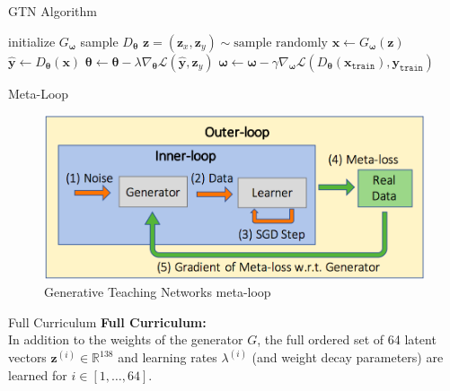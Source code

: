 \documentclass[10pt,usenames,dvipsnames]{beamer}
\renewcommand\vec[1]{\boldsymbol{\mathbf {#1}}}
\newcommand\R{\mathbb {R}}
\begin{document}
\begin{frame}{GTN Algorithm}
    \begin{algorithm}[H]
    \caption*{\textbf{Algorithm} Generative Teaching Networks}
    \begin{algorithmic}
    \STATE initialize $G_{\vec\omega}$
    \STATE sample $D_{\vec\theta}$
        \STATE $\vec z = (\vec z_x, \vec z_y) \sim \text{sample randomly}$
        \STATE $\vec x \gets G_{\vec\omega}(\vec z)$
        \STATE $\hat {\vec y} \gets D_{\vec\theta}(\vec x)$
        \STATE ${\vec\theta} \gets {\vec\theta} - \lambda \nabla_{\vec\theta} \mathcal L(\hat{\vec y}, \vec z_y)$
    \ENDFOR
    \STATE ${\vec\omega} \gets {\vec\omega} - \gamma \nabla_{\vec\omega} \mathcal L(D_{\vec\theta}(\vec x_{\texttt{train}}), \vec y_{\texttt{train}})$
    \ENDFOR
    \end{algorithmic}
    \end{algorithm}
\end{frame}


\begin{frame}{Meta-Loop}
    \begin{figure}
        \centering
        \includegraphics[width=\textwidth]{figures/Meta-Learning.png}
        \caption{Generative Teaching Networks meta-loop \cite{such2019generative}}
    \end{figure}
\end{frame}

\begin{frame}{Full Curriculum}
    \textbf{Full Curriculum:} \\
    In addition to the weights of the generator $G$, the full ordered set of 64 latent vectors $\vec z^{(i)} \in \R^{138}$ and
    learning rates $\lambda^{(i)}$ (and weight decay parameters)
    are learned for $i \in [1,\ldots, 64]$.
\end{frame}
\end{document}
